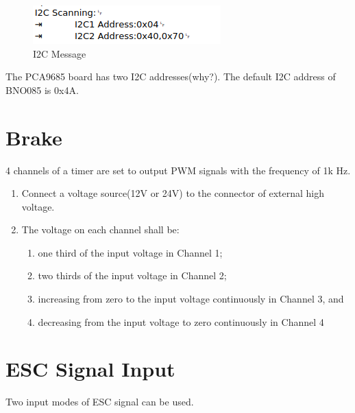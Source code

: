 \documentclass{article}
\begin{document}
\begin{figure}
    \centering
    \includegraphics[totalheight=1.5cm]{i2c.png}
    \caption{I2C Message}
    \label{fig:i2c}
\end{figure}

The PCA9685 board has two I2C addresses(why?). The default I2C address of BNO085 is 0x4A.

\section{Brake}
4 channels of a timer are set to output PWM signals with the frequency of 1k Hz.
\begin{enumerate}
    \item Connect a voltage source(12V or 24V) to the connector of external high voltage. 
    \item The voltage on each channel shall be:
    \begin{enumerate}
        \item one third of the input voltage in Channel 1;
        \item two thirds of the input voltage in Channel 2;
        \item increasing from zero to the input voltage continuously in Channel 3, and
        \item decreasing from the input voltage to zero continuously in Channel 4
    \end{enumerate}    
 
\end{enumerate}

\section{ESC Signal Input}
Two input modes of ESC signal can be used.
\end{document}
